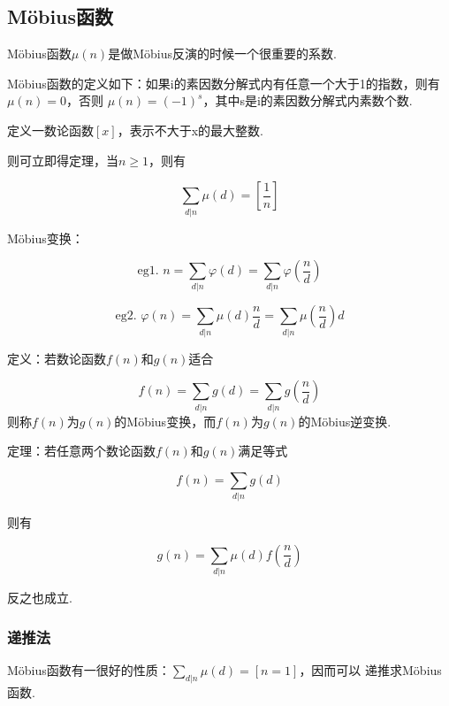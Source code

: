     \subsection{M\"{o}bius函数}\small
M\"{o}bius函数$\mu (n)$是做M\"{o}bius反演的时候一个很重要的系数.

M\"{o}bius函数的定义如下：如果i的素因数分解式内有任意一个大于1的指数，则有
$\mu (n) = 0$，否则
$\mu (n) = (-1)^s$，其中s是i的素因数分解式内素数个数.

定义一数论函数$[x]$，表示不大于x的最大整数.

则可立即得定理，当$n \geq 1$，则有

\begin{equation}
\sum\limits_{d|n} \mu (d) = [\frac{1}{n}]
\end{equation}

M\"{o}bius变换：

\begin{equation}
\text{eg1.\ }n = \sum\limits_{d|n} \varphi (d) = \sum\limits_{d|n} \varphi (\frac{n}{d})
\end{equation}

\begin{equation}
\text{eg2.\ }\varphi (n) = \sum\limits_{d|n} \mu (d) \frac{n}{d} = \sum\limits_{d|n} \mu (\frac{n}{d}) d
\end{equation}

定义：若数论函数$f(n)$和$g(n)$适合

\begin{equation}
f(n) = \sum\limits_{d|n} g(d) = \sum\limits_{d|n} g(\frac{n}{d})
\end{equation}
则称$f(n)$为$g(n)$的M\"{o}bius变换，而$f(n)$为$g(n)$的M\"{o}bius逆变换.


定理：若任意两个数论函数$f(n)$和$g(n)$满足等式

\begin{equation}
f(n) = \sum\limits_{d|n} g(d)
\end{equation}

则有

\begin{equation}
g(n) = \sum\limits_{d|n} \mu (d) f(\frac{n}{d})
\end{equation}

反之也成立.


        \subsubsection{递推法}\small
M\"{o}bius函数有一很好的性质：$\sum\limits_{d|n} \mu (d) = [n = 1]$，因而可以
递推求M\"{o}bius函数.

